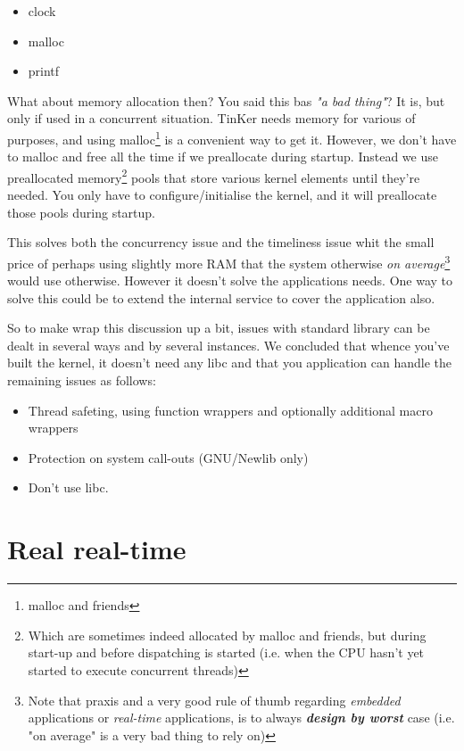 \begin{itemize}
	\item clock
	\item malloc
	\item printf
\end{itemize}
What about memory allocation then? You said this bas \textit{"a bad thing"}? It is, but only if used in a concurrent situation. TinKer needs memory for various of purposes, and using malloc\footnote{malloc and friends} is a convenient way to get it. However, we don't have to malloc and free all the time if we preallocate during startup. Instead we use preallocated memory\footnote{Which are sometimes indeed allocated by malloc and friends, but during start-up and before dispatching is started (i.e. when the CPU hasn't yet started to execute concurrent threads) } pools that store various kernel elements until they're needed. You only have to configure/initialise the kernel, and it will preallocate those pools during startup. 

This solves both the concurrency issue and the timeliness issue whit the small price of perhaps using slightly more RAM that the system otherwise \textit{on average}\footnote{Note that praxis and a very good rule of thumb regarding \textit{embedded} applications or \textit{real-time} applications, is to always \textit{\textbf{design by worst}} case (i.e. "on average" is a very bad thing to rely on) } would use otherwise.  However it doesn't solve the applications needs. One way to solve this could be to extend the internal service to cover the application also.

So to make wrap this discussion up a bit, issues with standard library can be dealt in several ways and by several instances. We concluded that whence you've built the kernel, it doesn't need any libc and that you application can handle the remaining issues as follows:

\begin{itemize}
	\item Thread safeting, using function wrappers and optionally additional macro wrappers
	\item Protection on system call-outs (GNU/Newlib only)
	\item Don't use libc.
\end{itemize}




\chapter{Real real-time}

